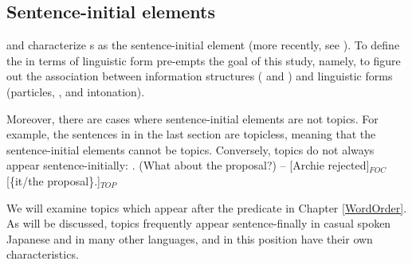 \subsection{Sentence-initial elements}

 and  characterize s as the sentence-initial element
(more recently, see ).
To define the  in terms of linguistic form pre-empts the goal of this study, namely, to figure out the association between information structures ( and ) and linguistic forms (particles, , and intonation).

Moreover, there are cases where sentence-initial elements are not topics.
For example, the sentences in \LLast in the last section are topicless, meaning that the sentence-initial elements cannot be topics. Conversely, topics do not always appear sentence-initially:
%
\ex. (What about the proposal?) -- [Archie rejected]$_{FOC}$ [\{it/the proposal\}.]$_{TOP}$

We will examine topics which appear after the predicate
in Chapter \ref{WordOrder}.
As will be discussed, topics frequently appear sentence-finally in casual spoken Japanese and in many other languages, and in this position have their own characteristics.

%


